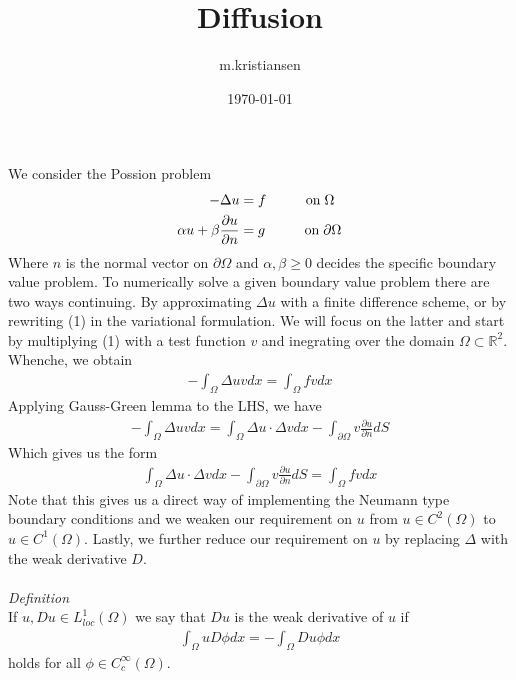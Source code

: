 \documentclass[11pt, norsk, a4paper]{article}
\title{Diffusion}
\author{m.kristiansen}
\date{\today}
\begin{document}
\maketitle


We consider the Possion problem 
\begin{align}
    -\Delta u &= f \hspace{1cm} \text{on} \hspace{0.1cm} \Omega \\
    \alpha u + \beta \frac{\partial u}{\partial n} &= g \hspace{1cm} \text{on} \hspace{0.1cm} \partial\Omega 
\end{align}
Where $n$ is the normal vector on $\partial \Omega$ and $\alpha, \beta \geq 0$ decides the specific boundary value problem. To numerically solve a given boundary value problem there are two ways continuing. By approximating $\Delta u$ with a finite difference scheme, or by rewriting (1) in the variational formulation. We will focus on the latter and start by multiplying (1) with a test function $v$ and inegrating over the domain $\Omega \subset \mathbb{R}^2$. Whenche, we obtain 
\begin{align*}
    -\int_{\Omega} \Delta uv dx = \int_\Omega fv dx 
\end{align*}
Applying Gauss-Green lemma to the LHS, we have 
\begin{align*}
    -\int_{\Omega} \Delta uv dx = \int_\Omega \Delta u \cdot \Delta v dx -\int_{\partial \Omega} v\frac{\partial u}{\partial n} dS
\end{align*}
Which gives us the form 
\begin{align*}
 \int_\Omega \Delta u \cdot \Delta v dx -\int_{\partial \Omega} v\frac{\partial u}{\partial n} dS = \int_\Omega fv dx
\end{align*}
Note that this gives us a direct way of implementing the Neumann type boundary conditions and we weaken our requirement on $u$ from $u \in C^2(\Omega)$ to $u \in C^1(\Omega)$. Lastly, we further reduce our requirement on $u$ by replacing $\Delta$ with the weak derivative $D$. \\
\\
\textit{Definition}\\
If $u, Du \in L^1_{loc}(\Omega)$ we say that $Du$ is the weak derivative of $u$ if 
\begin{align*}
    \int_\Omega uD\phi dx  = -\int_\Omega Du \phi dx 
\end{align*}
holds for all $\phi \in C^\infty_c(\Omega)$. \\
\end{document}
